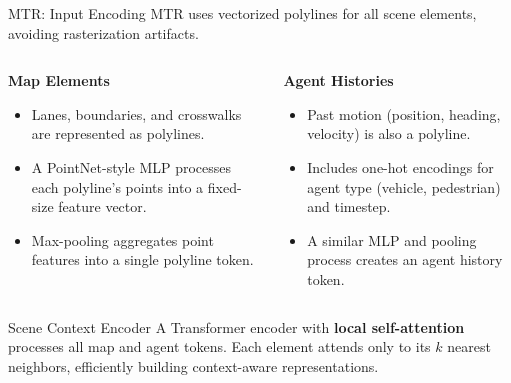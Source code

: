 \documentclass[10pt,aspectratio=169]{beamer}
\begin{document}
\begin{frame}{MTR: Input Encoding}
    MTR uses vectorized polylines for all scene elements, avoiding rasterization artifacts.
    \begin{columns}[T]
        \begin{column}{0.5\textwidth}
            \textbf{Map Elements}
            \begin{itemize}
                \item Lanes, boundaries, and crosswalks are represented as polylines.
                \item A PointNet-style MLP processes each polyline's points into a fixed-size feature vector.
                \item Max-pooling aggregates point features into a single polyline token.
            \end{itemize}
        \end{column}
        \begin{column}{0.5\textwidth}
            \textbf{Agent Histories}
            \begin{itemize}
                \item Past motion (position, heading, velocity) is also a polyline.
                \item Includes one-hot encodings for agent type (vehicle, pedestrian) and timestep.
                \item A similar MLP and pooling process creates an agent history token.
            \end{itemize}
        \end{column}
    \end{columns}
    \vfill
    \begin{block}{Scene Context Encoder}
        A Transformer encoder with \textbf{local self-attention} processes all map and agent tokens. Each element attends only to its $k$ nearest neighbors, efficiently building context-aware representations.
    \end{block}
\end{frame}
\end{document}
